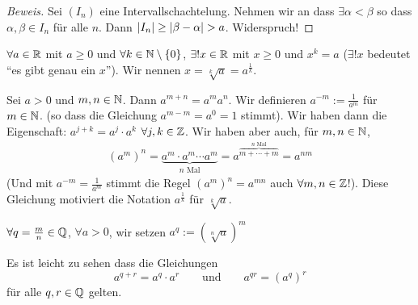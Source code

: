 \begin{proof}[Beweis]
  Sei $(I_n)$ eine Intervallschachtelung. Nehmen wir an dass $\exists \alpha < \beta$ so dass $\alpha, \beta\in I_n$
f\"ur alle $n$. Dann $\abs{I_n}\geq\abs{\beta-\alpha}> a$. Widerspruch!
\end{proof}
\begin{Sat}\label{s:Wurz}
$\forall a\in\mathbb{R}$ mit $a\geq 0$ und $\forall k\in\mathbb{N}\setminus\left\{ 0 \right\}$, 
$\exists ! x\in\mathbb{R}$ mit 
$x\geq 0$ und $x^k=a$ ($\exists ! x$ bedeutet ``es gibt genau ein $x$''). 
Wir nennen $x=\sqrt[k]{a}=a^\frac{1}{k}$.\\
\end{Sat}

Sei $a>0$ und $m,n\in\mathbb{N}$. Dann $a^{m+n}=a^ma^n$. Wir definieren $a^{-m}:=\frac{1}{a^m}$ f\"ur $m\in\mathbb{N}$.
(so dass die Gleichung $a^{m-m}=a^0=1$ stimmt). Wir haben dann die Eigenschaft: $a^{j+k}= a^j\cdot a^k$ $\forall
j,k\in \mathbb{Z}$. Wir haben aber auch, f\"ur $m,n\in \mathbb{N}$, 
  \begin{align*}
    (a^m)^n=\underbrace{a^m\cdot a^m \cdots a^m}_{\text{$n$ Mal}} = a^{\overbrace{m+\cdots+m}^{\text{$n$ Mal}}} = a^{nm}
  \end{align*}
(Und mit $a^{-m}=\frac{1}{a^m}$ stimmt die Regel $(a^m)^n=a^{mn}$ auch $\forall m,n\in\mathbb{Z}$!).
Diese Gleichung motiviert die Notation
$a^\frac{1}{k}$ f\"ur $\sqrt[k]{a}$.

\begin{Def}
  $\forall q=\frac{m}{n}\in\mathbb{Q}$, $\forall a>0$, wir setzen $a^q :=\left(\sqrt[n]{a}\right)^m$
\end{Def}

Es ist leicht zu sehen dass die Gleichungen
$$
a^{q+r} = a^q\cdot a^r \qquad \mbox{und} \qquad a^{qr}=(a^q)^r
$$
f\"ur alle $q,r\in \mathbb{Q}$ gelten.
